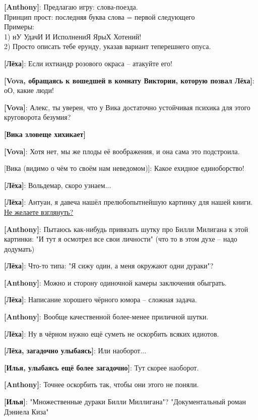 \begin{flushleft}
\textbf{[Anthony]}: Предлагаю игру: слова-поезда.\\
Принцип прост: последняя буква слова = первой следующего\\
Примеры:\\
1) нУ УдачИ И ИсполнениЯ ЯрыХ Хотений!\\
2) Просто описать тебе ерунду, указав вариант теперешнего опуса.

\textbf{[Лёха]}: Если ихтиандр розового окраса -- атакуйте его!

\textbf{[Vova, обращаясь к вошедшей в комнату Виктории, которую позвал Лёха]}: оО, какие люди!

\textbf{[Vova]}: Алекс, ты уверен, что у Вика достаточно устойчивая психика для этого круговорота безумия?

\textbf{[Вика зловеще хихикает]}

\textbf{[Vova]}: Хотя нет, мы же плоды её воображения, и она сама это подстроила.

[Вика (видимо о чём то своём нам неведомом)]: Какое ехидное единоборство!

\textbf{[Лёха]}: Вольдемар, скоро узнаем...

\textbf{[Лёха]}: Антуан, я давеча нашёл прелюбопытнейшую картинку для нашей книги. \href{http://cs8.pikabu.ru/post_img/2016/10/14/5/1476431396146890414.jpg}{Не желаете взглянуть?}

\textbf{[Anthony]}: Пытаюсь как-нибудь привязать шутку про Билли Милигана к этой картинки: "И тут я осмотрел все свои личности" (что то в этом духе -- надо додумать)

\textbf{[Лёха]}: Что-то типа: "Я сижу один, а меня окружают одни дураки"?

\textbf{[Anthony]}: Можно и сторону одиночной камеры заключения обыграть.

\textbf{[Лёха]}: Написание хорошего чёрного юмора -- сложная задача.

\textbf{[Anthony]}: Вообще качественной более-менее приличной шутки.

\textbf{[Лёха]}: Ну в чёрном нужно ещё суметь не оскорбить всяких идиотов.

\textbf{[Лёха, загадочно улыбаясь]}: Или наоборот...

\textbf{[Илья, улыбаясь ещё более загадочно]}: Тут скорее наоборот.

\textbf{[Anthony]}: Точнее оскорбить так, чтобы они этого не поняли.

\textbf{[Илья]}: "Множественные дураки Билли Миллигана"?
"Документальный роман Дэниела Киза"


\end{flushleft}
